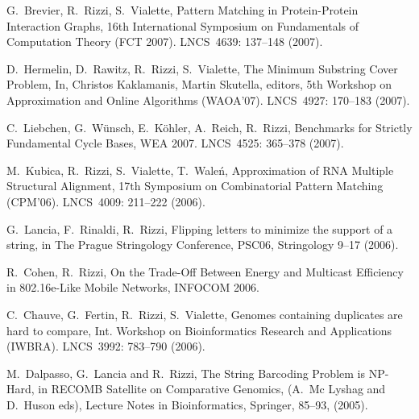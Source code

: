 \begin{etaremune}
\vspace{-1.8mm}
  \item {G.~Brevier, R.~Rizzi, S.~Vialette},
   \newblock Pattern Matching in Protein-Protein Interaction Graphs,
   \newblock 16th International Symposium on Fundamentals
              of Computation Theory (FCT 2007).
   \newblock LNCS~4639: 137--148 (2007).

\vspace{-1.8mm}
  \item {D.~Hermelin, D.~Rawitz, R.~Rizzi, S.~Vialette},
   \newblock The Minimum Substring Cover Problem,
   \newblock In, Christos Kaklamanis, Martin Skutella, editors,
   \newblock 5th Workshop on Approximation and Online Algorithms (WAOA'07).
   \newblock LNCS~4927: 170--183 (2007).

\vspace{-1.8mm}
  \item {C.~Liebchen, G.~W\"unsch, E.~K\"ohler, A.~Reich, R.~Rizzi},
   \newblock Benchmarks for Strictly Fundamental Cycle Bases,
   \newblock WEA 2007.
   \newblock LNCS~4525: 365--378 (2007).

\vspace{-1.8mm}
  \item {M.~Kubica, R.~Rizzi, S.~Vialette, T.~Wale\'n},
   \newblock Approximation of RNA Multiple Structural Alignment,
   \newblock 17th Symposium on Combinatorial Pattern Matching (CPM'06).
   \newblock LNCS~4009: 211--222 (2006).

\vspace{-1.8mm}
  \item {G.~Lancia, F.~Rinaldi, R.~Rizzi},
   \newblock Flipping letters to minimize the support of a string,
   \newblock in The Prague Stringology Conference, PSC06,
   \newblock Stringology 9--17 (2006).

\vspace{-1.8mm}
  \item {\sc R.~Cohen, R.~Rizzi},
   \newblock   On the Trade-Off Between Energy and Multicast Efficiency in 802.16e-Like Mobile Networks,
   \newblock INFOCOM 2006.

\vspace{-1.8mm}
  \item {C.~Chauve, G.~Fertin, R.~Rizzi, S.~Vialette},
   \newblock Genomes containing duplicates are hard to compare,
   \newblock Int. Workshop on Bioinformatics Research and Applications (IWBRA).
   \newblock LNCS~3992: 783--790 (2006).

\vspace{-1.8mm}
  \item {M.~Dalpasso, G.~Lancia and R.~Rizzi},
   \newblock The String Barcoding Problem is NP-Hard,
   \newblock in RECOMB Satellite on Comparative Genomics, (A.~Mc Lyshag and D.~Huson eds),
   \newblock Lecture Notes in Bioinformatics, Springer, 85--93, (2005). 


\end{etaremune}
